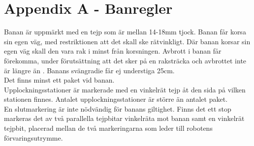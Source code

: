 \section{Appendix A - Banregler}

Banan är uppmärkt med en tejp som är mellan 14-18mm tjock. Banan får korsa sin egen väg, med restriktionen att det skall ske rätvinkligt. Där banan korsar sin egen väg skall den vara rak i minst \todo{10cm} från korsningen. Avbrott i banan får förekomma, under förutsättning att det sker på en raksträcka och avbrottet inte är längre än \todo{10 cm}. Banans svängradie får ej understiga 25cm. \\
Det finns minst ett paket vid banan. \\
Upplockningsstationer är markerade med en vinkelrät tejp åt den sida på vilken stationen finnes. Antalet upplockningsstationer är större än antalet paket. \\
En slutmarkering är inte nödvändig för banans giltighet. Finns det ett stop markeras det av två parallella tejpbitar vinkelräta mot banan samt en vinkelrät tejpbit, placerad mellan de två markeringarna som leder till robotens förvaringsutrymme.
